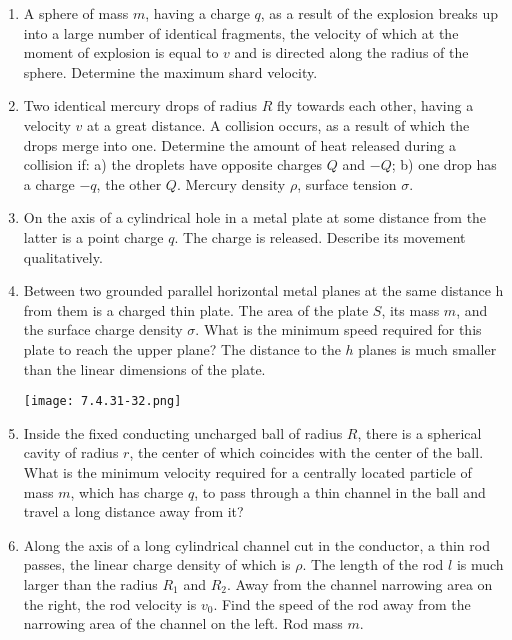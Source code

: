 \documentclass{article}
\begin{document}
\begin{enumerate}[label=7.4.\arabic*]
\item A sphere of mass $m$, having a charge $q$, as a result of the explosion breaks up into a large number of identical fragments, the velocity of which at the moment of explosion is equal to $v$ and is directed along the radius of the sphere. Determine the maximum shard velocity.

\item Two identical mercury drops of radius $R$ fly towards each other, having a velocity $v$ at a great distance. A collision occurs, as a result of which the drops merge into one. Determine the amount of heat released during a collision if: a) the droplets have opposite charges $Q$ and $-Q$; b) one drop has a charge $-q$, the other $Q$. Mercury density $\rho$, surface tension $\sigma$.

\item On the axis of a cylindrical hole in a metal plate at some distance from the latter is a point charge $q$. The charge is released. Describe its movement qualitatively.

\item Between two grounded parallel horizontal metal planes at the same distance h from them is a charged thin plate. The area of the plate $S$, its mass $m$, and the surface charge density $\sigma$. What is the minimum speed required for this plate to reach the upper plane? The distance to the $h$ planes is much smaller than the linear dimensions of the plate.

\begin{center}
    \texttt{[image: 7.4.31-32.png]}
\end{center}


\item Inside the fixed conducting uncharged ball of radius $R$, there is a spherical cavity of radius $r$, the center of which coincides with the center of the ball. What is the minimum velocity required for a centrally located particle of mass $m$, which has charge $q$, to pass through a thin channel in the ball and travel a long distance away from it?

\item Along the axis of a long cylindrical channel cut in the conductor, a thin rod passes, the linear charge density of which is $\rho$. The length of the rod $l$ is much larger than the radius $R_1$ and $R_2$. Away from the channel narrowing area on the right, the rod velocity is $v_0$. Find the speed of the rod away from the narrowing area of the channel on the left. Rod mass $m$.


\end{enumerate}
\end{document}
